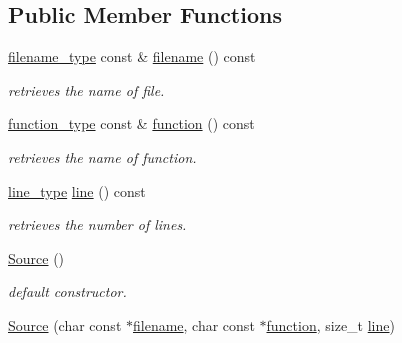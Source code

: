 \subsection*{Public Member Functions}
\begin{DoxyCompactItemize}
\item 
\hypertarget{classhryky_1_1debug_1_1_source_a9873e6e1838a274b3f59ff79a91ed3fa}{\hyperlink{classhryky_1_1debug_1_1_source_a443943cd6616be5b4a0c7e200ced19ce}{filename\-\_\-type} const \& \hyperlink{classhryky_1_1debug_1_1_source_a9873e6e1838a274b3f59ff79a91ed3fa}{filename} () const }\label{classhryky_1_1debug_1_1_source_a9873e6e1838a274b3f59ff79a91ed3fa}

\begin{DoxyCompactList}\small\item\em retrieves the name of file. \end{DoxyCompactList}\item 
\hypertarget{classhryky_1_1debug_1_1_source_a648474141d21505af7aade64ef62a403}{\hyperlink{classhryky_1_1debug_1_1_source_ae9faf9b2e482bf46211ced4e9a5e4680}{function\-\_\-type} const \& \hyperlink{classhryky_1_1debug_1_1_source_a648474141d21505af7aade64ef62a403}{function} () const }\label{classhryky_1_1debug_1_1_source_a648474141d21505af7aade64ef62a403}

\begin{DoxyCompactList}\small\item\em retrieves the name of function. \end{DoxyCompactList}\item 
\hypertarget{classhryky_1_1debug_1_1_source_ae8b6fa3524cc94a532dd31e46ff029a0}{\hyperlink{classhryky_1_1debug_1_1_source_a5cf259e1e55170cf5a025a31576ce7c6}{line\-\_\-type} \hyperlink{classhryky_1_1debug_1_1_source_ae8b6fa3524cc94a532dd31e46ff029a0}{line} () const }\label{classhryky_1_1debug_1_1_source_ae8b6fa3524cc94a532dd31e46ff029a0}

\begin{DoxyCompactList}\small\item\em retrieves the number of lines. \end{DoxyCompactList}\item 
\hyperlink{classhryky_1_1debug_1_1_source_a18b3ee100c2a07aa5b226f5a64156109}{Source} ()
\begin{DoxyCompactList}\small\item\em default constructor. \end{DoxyCompactList}\item 
\hypertarget{classhryky_1_1debug_1_1_source_ad882a5e6d1a85828fd21b1e8b6d8489f}{\hyperlink{classhryky_1_1debug_1_1_source_ad882a5e6d1a85828fd21b1e8b6d8489f}{Source} (char const $\ast$\hyperlink{classhryky_1_1debug_1_1_source_a9873e6e1838a274b3f59ff79a91ed3fa}{filename}, char const $\ast$\hyperlink{classhryky_1_1debug_1_1_source_a648474141d21505af7aade64ef62a403}{function}, size\-\_\-t \hyperlink{classhryky_1_1debug_1_1_source_ae8b6fa3524cc94a532dd31e46ff029a0}{line})}\label{classhryky_1_1debug_1_1_source_ad882a5e6d1a85828fd21b1e8b6d8489f}


\end{DoxyCompactItemize}
